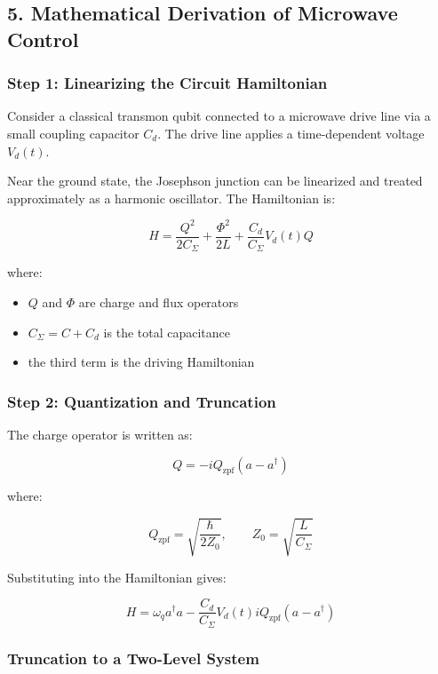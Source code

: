 \documentclass[
]{article}
\providecommand{\tightlist}{%
  \setlength{\itemsep}{0pt}\setlength{\parskip}{0pt}}
\begin{document}
\subsection{5. Mathematical Derivation of Microwave
Control}\label{mathematical-derivation-of-microwave-control}

\subsubsection{Step 1: Linearizing the Circuit
Hamiltonian}\label{step-1-linearizing-the-circuit-hamiltonian}

Consider a classical transmon qubit connected to a microwave drive line
via a small coupling capacitor \(C_d\). The drive line applies a
time-dependent voltage \(V_d(t)\).

Near the ground state, the Josephson junction can be linearized and
treated approximately as a harmonic oscillator. The Hamiltonian is:

\[
H = \frac{Q^2}{2C_\Sigma} + \frac{\Phi^2}{2L} + \frac{C_d}{C_\Sigma}V_d(t)Q
\]

where:

\begin{itemize}
\tightlist
\item
  \(Q\) and \(\Phi\) are charge and flux operators
\item
  \(C_\Sigma = C + C_d\) is the total capacitance
\item
  the third term is the driving Hamiltonian
\end{itemize}

\subsubsection{Step 2: Quantization and
Truncation}\label{step-2-quantization-and-truncation}

The charge operator is written as:

\[
Q = -iQ_{\text{zpf}}(a - a^\dagger)
\]

where:

\[
Q_{\text{zpf}} = \sqrt{\frac{\hbar}{2Z_0}}, \qquad Z_0 = \sqrt{\frac{L}{C_\Sigma}}
\]

Substituting into the Hamiltonian gives:

\[
H = \omega_q a^\dagger a - \frac{C_d}{C_\Sigma}V_d(t)iQ_{\text{zpf}}(a - a^\dagger)
\]

\subsubsection{Truncation to a Two-Level
System}\label{truncation-to-a-two-level-system}
\end{document}
